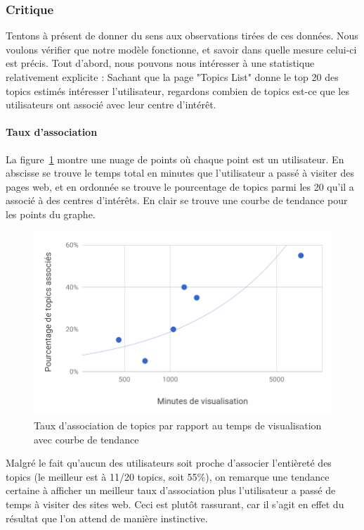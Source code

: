 \FloatBarrier

		\subsubsection{Critique}

			Tentons à présent de donner du sens aux observations tirées de ces données. Nous voulons vérifier que notre modèle fonctionne, et savoir dans quelle mesure celui-ci est précis. Tout d'abord, nous pouvons nous intéresser à une statistique relativement explicite : Sachant que la page "Topics List" donne le top 20 des topics estimés intéresser l'utilisateur, regardons combien de topics est-ce que les utilisateurs ont associé avec leur centre d'intérêt. 

			\paragraph{Taux d'association} La figure~\ref{chart-1} montre une nuage de points où chaque point est un utilisateur. En abscisse se trouve le temps total en minutes que l'utilisateur a passé à visiter des pages web, et en ordonnée se trouve le pourcentage de topics parmi les 20 qu'il a associé à des centres d'intérêts. En clair se trouve une courbe de tendance pour les points du graphe.

			\begin{figure}[!h]
				\centering
				\includegraphics[height=0.6\textwidth]{images/results/chart-1}
				\caption{Taux d'association de topics par rapport au temps de visualisation avec courbe de tendance}
				\label{chart-1}
			\end{figure}

			Malgré le fait qu'aucun des utilisateurs soit proche d'associer l'entièreté des topics (le meilleur est à 11/20 topics, soit 55\%), on remarque une tendance certaine à afficher un meilleur taux d'association plus l'utilisateur a passé de temps à visiter des sites web. Ceci est plutôt rassurant, car il s'agit en effet du résultat que l'on attend de manière instinctive.

